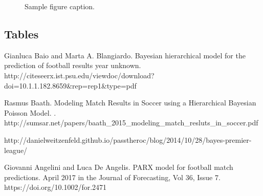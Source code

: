 \documentclass{article}
\begin{document}
\begin{figure}[h]
  \centering
  \fbox{\rule[-.5cm]{4cm}{4cm} \rule[-.5cm]{4cm}{0cm}}
  \caption{Sample figure caption.}
  \label{fig:fig1}
\end{figure}

\subsection{Tables}



  


\begin{thebibliography}{1}

Gianluca Baio and Marta A. Blangiardo.
\newblock Bayesian hierarchical model for the prediction of football results
\newblock year unknown.
\newblock http://citeseerx.ist.psu.edu/viewdoc/download?doi=10.1.1.182.8659\&rep=rep1\&type=pdf

Rasmus Baath.
\newblock Modeling Match Results in Soccer using a Hierarchical Bayesian Poisson Model.
.
\newblock http://sumsar.net/papers/baath\_2015\_modeling\_match\_resluts\_in\_soccer.pdf

\newblock http://danielweitzenfeld.github.io/passtheroc/blog/2014/10/28/bayes-premier-league/

Giovanni Angelini and Luca De Angelis.
\newblock PARX model for football match predictions.
 April 2017 in the Journal of Forecasting, Vol 36, Issue 7.
\newblock https://doi.org/10.1002/for.2471

\end{thebibliography}
\end{document}
